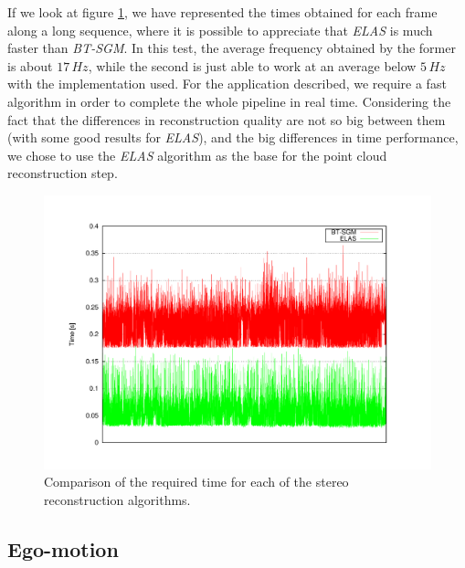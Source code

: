 If we look at figure \ref{fig:cp05_times_elas_btsgm}, we have represented the times obtained for each frame along a long sequence, where it is possible to appreciate that \emph{ELAS} is much faster than \emph{BT-SGM}. In this test, the average frequency obtained by the former is about $17\,Hz$, while the second is just able to work at an average below $5\,Hz$ with the implementation used. For the application described, we require a fast algorithm in order to complete the whole pipeline in real time. Considering the fact that the differences in reconstruction quality are not so big between them (with some good results for \emph{ELAS}), and the big differences in time performance, we chose to use the \emph{ELAS} algorithm as the base for the point cloud reconstruction step.

 \begin{figure}[t]
  \centering
  \includegraphics[width=\textwidth,height=0.5\textwidth, trim=50 50 90 60, clip]{timesELAS_OPENCV}
  \caption{Comparison of the required time for each of the stereo reconstruction algorithms.}\label{fig:cp05_times_elas_btsgm}
\end{figure}

\subsection{Ego-motion}\label{ch:chapter05_02_02}

